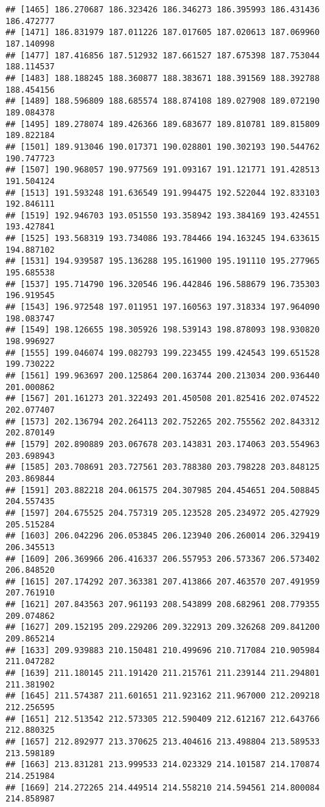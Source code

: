 \documentclass[]{article}
\begin{document}
\begin{verbatim}
## [1465] 186.270687 186.323426 186.346273 186.395993 186.431436 186.472777
## [1471] 186.831979 187.011226 187.017605 187.020613 187.069960 187.140998
## [1477] 187.416856 187.512932 187.661527 187.675398 187.753044 188.114537
## [1483] 188.188245 188.360877 188.383671 188.391569 188.392788 188.454156
## [1489] 188.596809 188.685574 188.874108 189.027908 189.072190 189.084378
## [1495] 189.278074 189.426366 189.683677 189.810781 189.815809 189.822184
## [1501] 189.913046 190.017371 190.028801 190.302193 190.544762 190.747723
## [1507] 190.968057 190.977569 191.093167 191.121771 191.428513 191.504124
## [1513] 191.593248 191.636549 191.994475 192.522044 192.833103 192.846111
## [1519] 192.946703 193.051550 193.358942 193.384169 193.424551 193.427841
## [1525] 193.568319 193.734086 193.784466 194.163245 194.633615 194.887102
## [1531] 194.939587 195.136288 195.161900 195.191110 195.277965 195.685538
## [1537] 195.714790 196.320546 196.442846 196.588679 196.735303 196.919545
## [1543] 196.972548 197.011951 197.160563 197.318334 197.964090 198.083747
## [1549] 198.126655 198.305926 198.539143 198.878093 198.930820 198.996927
## [1555] 199.046074 199.082793 199.223455 199.424543 199.651528 199.730222
## [1561] 199.963697 200.125864 200.163744 200.213034 200.936440 201.000862
## [1567] 201.161273 201.322493 201.450508 201.825416 202.074522 202.077407
## [1573] 202.136794 202.264113 202.752265 202.755562 202.843312 202.870149
## [1579] 202.890889 203.067678 203.143831 203.174063 203.554963 203.698943
## [1585] 203.708691 203.727561 203.788380 203.798228 203.848125 203.869844
## [1591] 203.882218 204.061575 204.307985 204.454651 204.508845 204.557435
## [1597] 204.675525 204.757319 205.123528 205.234972 205.427929 205.515284
## [1603] 206.042296 206.053845 206.123940 206.260014 206.329419 206.345513
## [1609] 206.369966 206.416337 206.557953 206.573367 206.573402 206.848520
## [1615] 207.174292 207.363381 207.413866 207.463570 207.491959 207.761910
## [1621] 207.843563 207.961193 208.543899 208.682961 208.779355 209.074862
## [1627] 209.152195 209.229206 209.322913 209.326268 209.841200 209.865214
## [1633] 209.939883 210.150481 210.499696 210.717084 210.905984 211.047282
## [1639] 211.180145 211.191420 211.215761 211.239144 211.294801 211.381902
## [1645] 211.574387 211.601651 211.923162 211.967000 212.209218 212.256595
## [1651] 212.513542 212.573305 212.590409 212.612167 212.643766 212.880325
## [1657] 212.892977 213.370625 213.404616 213.498804 213.589533 213.598189
## [1663] 213.831281 213.999533 214.023329 214.101587 214.170874 214.251984
## [1669] 214.272265 214.449514 214.558210 214.594561 214.800084 214.858987

\end{verbatim}
\end{document}
